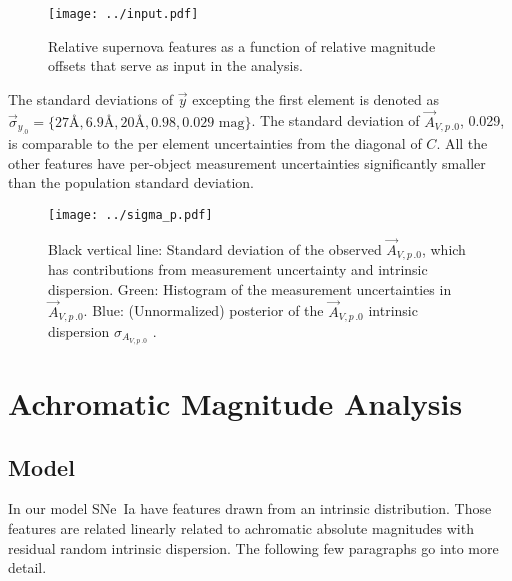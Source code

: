 \documentclass{aastex61}   	%
\begin{document}
\begin{figure}[htbp] %
   \centering
   \texttt{[image: ../input.pdf]}
   \caption{Relative supernova features as a function of relative magnitude offsets that serve as input in the analysis. 
   \label{input:fig}}
\end{figure}

\begin{sloppypar}
The standard deviations of $\vec{y}$ excepting the first element is denoted as
${\vec{\sigma}_{y_{.0}}=\{27\text{\AA},  6.9\text{\AA},  20\text{\AA},   0.98,   0.029 \text{ mag}\}}$.
The  standard deviation of $\vec{A}_{V,p\,.0}$, 0.029,  is comparable to the per element uncertainties from the diagonal of $C$.
All the other features have per-object measurement uncertainties significantly smaller than the population standard deviation.
\end{sloppypar}

\begin{figure}[htbp] %
   \centering
   \texttt{[image: ../sigma\_p.pdf]}
   \caption{Black vertical line: Standard deviation of the observed $\vec{A}_{V,p\,.0}$, which has contributions from  measurement
   uncertainty and intrinsic dispersion.
Green: Histogram of the measurement uncertainties in $\vec{A}_{V,p\,.0}$.  
Blue: (Unnormalized) posterior of the $\vec{A}_{V,p\,.0}$ intrinsic dispersion $\sigma_{{A}_{V,p\,.0}}$ .
   \label{sigma_p:fig}}
\end{figure}

\section{Achromatic Magnitude Analysis}
\label{magnitude:sec}
\subsection{Model}
\label{achromaticmodel:sec}
In our model SNe~Ia have features drawn from an intrinsic distribution.  
Those features are related linearly related to achromatic absolute magnitudes with residual random intrinsic dispersion.
The following few paragraphs go into more detail.
\end{document}

